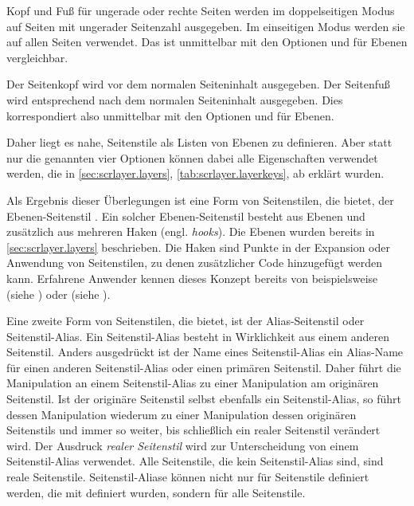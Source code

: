 Kopf und Fuß für ungerade oder rechte Seiten werden im doppelseitigen Modus auf Seiten mit ungerader Seitenzahl
ausgegeben. Im einseitigen Modus werden sie auf allen Seiten verwendet. Das
ist unmittelbar mit den
Optionen 
und  für Ebenen vergleichbar.

Der Seitenkopf wird vor dem normalen Seiteninhalt
ausgegeben. Der Seitenfuß wird entsprechend nach dem normalen Seiteninhalt
ausgegeben. Dies korrespondiert also unmittelbar mit den
Optionen
 und  für Ebenen.

Daher liegt es nahe, Seitenstile als Listen von Ebenen zu definieren. Aber
statt nur die genannten vier Optionen können dabei alle Eigenschaften
verwendet werden, die in \autoref{sec:scrlayer.layers},
\autoref{tab:scrlayer.layerkeys}, ab 
erklärt wurden.

Als Ergebnis dieser Überlegungen ist eine Form von Seitenstilen, die
 bietet, der Ebenen-Seitenstil%
. Ein
solcher Ebenen-Seitenstil besteht aus Ebenen und zusätzlich aus mehreren Haken
(engl. \emph{hooks}). Die Ebenen wurden bereits in
\autoref{sec:scrlayer.layers} beschrieben. Die
Haken sind Punkte in der Expansion
oder Anwendung von Seitenstilen, zu denen zusätzlicher Code hinzugefügt werden
kann. Erfahrene Anwender kennen dieses Konzept bereits von beispielsweise
 (siehe \cite{latex:usrguide}) oder
 (siehe
).

Eine zweite Form von Seitenstilen, die  bietet, ist der
Alias-Seitenstil%
 oder
Seitenstil-Alias. Ein Seitenstil-Alias besteht in Wirklichkeit aus einem
anderen Seitenstil. Anders ausgedrückt ist der Name eines Seitenstil-Alias ein
Alias-Name für einen anderen Seitenstil-Alias oder einen primären
Seitenstil. Daher führt die Manipulation an einem Seitenstil-Alias zu einer
Manipulation am originären Seitenstil. Ist der originäre Seitenstil selbst
ebenfalls ein Seitenstil-Alias, so führt dessen Manipulation wiederum zu einer
Manipulation dessen originären Seitenstils und immer so weiter, bis
schließlich ein realer Seitenstil verändert wird. Der Ausdruck \emph{realer
  Seitenstil} wird zur Unterscheidung von einem
Seitenstil-Alias verwendet. Alle Seitenstile, die kein Seitenstil-Alias sind,
sind reale Seitenstile. Seitenstil-Aliase können nicht nur für Seitenstile
definiert werden, die mit  definiert wurden, sondern für
alle Seitenstile.


